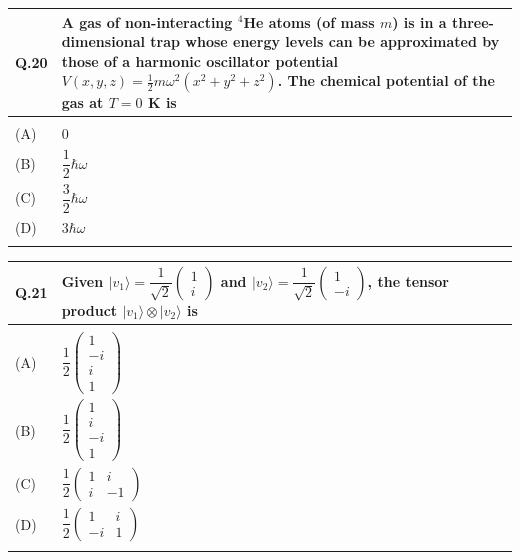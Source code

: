 \documentclass[12pt,a4paper]{article}
\begin{document}
\begin{tabular}{|p{1cm}|p{12cm}|}
\hline
Q.20 & A gas of non-interacting $^4$He atoms (of mass $m$) is in a three-dimensional trap whose
energy levels can be approximated by those of a harmonic oscillator potential
$V(x,y,z) = \frac{1}{2}m\omega^2(x^2 + y^2 + z^2)$. The chemical potential of the gas at $T{=}0$ K is \\
\hline
& \rule{0pt}{0.8cm} \\
\hline
(A) & \rule{0pt}{2em}$0$ \\[0.5em]
\hline
(B) & \rule{0pt}{2.5em}$\dfrac{1}{2}\hbar\omega$ \\[0.5em]
\hline
(C) & \rule{0pt}{2.5em}$\dfrac{3}{2}\hbar\omega$ \\[0.5em]
\hline
(D) & \rule{0pt}{2em}$3\hbar\omega$ \\[0.5em]
\hline
& \rule{0pt}{0.8cm} \\
\hline
\end{tabular}

\newpage
\vspace{1em}

\begin{tabular}{|p{1cm}|p{12cm}|}
\hline
Q.21 & Given $|v_1\rangle = \dfrac{1}{\sqrt{2}}\left(\begin{smallmatrix}1\\i\end{smallmatrix}\right)$
and $|v_2\rangle = \dfrac{1}{\sqrt{2}}\left(\begin{smallmatrix}1\\-i\end{smallmatrix}\right)$,
the tensor product $|v_1\rangle \otimes |v_2\rangle$ is \\
\hline
& \rule{0pt}{0.8cm} \\
\hline
(A) & \rule{0pt}{5em}$\dfrac{1}{2}\left(\begin{array}{c}1\\-i\\i\\1\end{array}\right)$ \\[4em]
\hline
(B) & \rule{0pt}{5em}$\dfrac{1}{2}\left(\begin{array}{c}1\\i\\-i\\1\end{array}\right)$ \\[4em]
\hline
(C) & \rule{0pt}{4em}$\dfrac{1}{2}\left(\begin{array}{cc}1 & i\\i & -1\end{array}\right)$ \\[3em]
\hline
(D) & \rule{0pt}{4em}$\dfrac{1}{2}\left(\begin{array}{cc}1 & i\\-i & 1\end{array}\right)$ \\[3em]
\hline
& \rule{0pt}{0.8cm} \\
\hline
\end{tabular}
\end{document}
